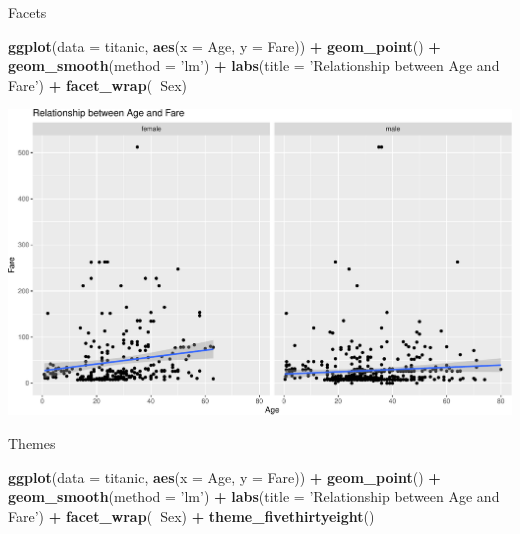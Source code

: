 \documentclass[
]{book}
\newenvironment{Shaded}{\begin{snugshade}}{\end{snugshade}}
\newcommand{\DataTypeTok}[1]{\textcolor[rgb]{0.13,0.29,0.53}{#1}}
\newcommand{\KeywordTok}[1]{\textcolor[rgb]{0.13,0.29,0.53}{\textbf{#1}}}
\newcommand{\NormalTok}[1]{#1}
\newcommand{\OperatorTok}[1]{\textcolor[rgb]{0.81,0.36,0.00}{\textbf{#1}}}
\newcommand{\StringTok}[1]{\textcolor[rgb]{0.31,0.60,0.02}{#1}}
\begin{document}
Facets

\begin{Shaded}
\begin{Highlighting}[]
\KeywordTok{ggplot}\NormalTok{(}\DataTypeTok{data =}\NormalTok{ titanic, }\KeywordTok{aes}\NormalTok{(}\DataTypeTok{x =}\NormalTok{ Age, }\DataTypeTok{y =}\NormalTok{ Fare)) }\OperatorTok{+}\StringTok{ }\KeywordTok{geom_point}\NormalTok{() }\OperatorTok{+}\StringTok{ }\KeywordTok{geom_smooth}\NormalTok{(}\DataTypeTok{method =} \StringTok{'lm'}\NormalTok{) }\OperatorTok{+}\StringTok{ }\KeywordTok{labs}\NormalTok{(}\DataTypeTok{title =} \StringTok{'Relationship between Age and Fare'}\NormalTok{) }\OperatorTok{+}
\StringTok{  }\KeywordTok{facet_wrap}\NormalTok{(}\OperatorTok{~}\NormalTok{Sex)}
\end{Highlighting}
\end{Shaded}

\includegraphics{figures/unnamed-chunk-139-1.pdf}

Themes

\begin{Shaded}
\begin{Highlighting}[]
\KeywordTok{ggplot}\NormalTok{(}\DataTypeTok{data =}\NormalTok{ titanic, }\KeywordTok{aes}\NormalTok{(}\DataTypeTok{x =}\NormalTok{ Age, }\DataTypeTok{y =}\NormalTok{ Fare)) }\OperatorTok{+}\StringTok{ }\KeywordTok{geom_point}\NormalTok{() }\OperatorTok{+}\StringTok{ }\KeywordTok{geom_smooth}\NormalTok{(}\DataTypeTok{method =} \StringTok{'lm'}\NormalTok{) }\OperatorTok{+}\StringTok{ }\KeywordTok{labs}\NormalTok{(}\DataTypeTok{title =} \StringTok{'Relationship between Age and Fare'}\NormalTok{) }\OperatorTok{+}
\StringTok{  }\KeywordTok{facet_wrap}\NormalTok{(}\OperatorTok{~}\NormalTok{Sex) }\OperatorTok{+}\StringTok{ }\KeywordTok{theme_fivethirtyeight}\NormalTok{()}
\end{Highlighting}
\end{Shaded}
\end{document}
